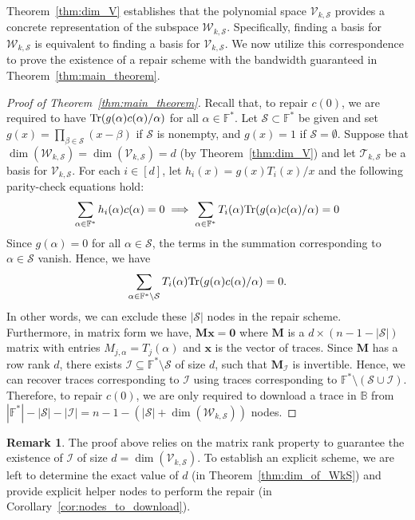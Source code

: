 \documentclass[onecolumn]{IEEEtran}
\theoremstyle{plain}
\theoremstyle{definition}
\newtheorem{remark}[definition]{Remark}
\newcommand{\FF}{\mathbb{F}}
\newcommand{\BB}{\mathbb{B}}
\newcommand{\cS}{\mathcal{S}}
\newcommand{\cT}{\mathcal{T}}
\newcommand{\cW}{\mathcal{W}}
\newcommand{\cV}{\mathcal{V}}
\newcommand{\cI}{\mathcal{I}}
\newcommand{\tr}{{\rm Tr}}
\begin{document}
Theorem~\ref{thm:dim_V} establishes that the polynomial space $\cV_{k,\cS}$ provides a concrete representation of the subspace $\cW_{k,\cS}$. 
Specifically, finding a basis for $\cW_{k,\cS}$ is equivalent to finding a basis for $\cV_{k,\cS}$.
We now utilize this correspondence to prove the existence of a repair scheme with the bandwidth guaranteed in Theorem~\ref{thm:main_theorem}.

\begin{proof}[Proof of Theorem~\ref{thm:main_theorem}]
    Recall that, to repair $c(0)$, we are required to have $\tr(g(\alpha)c(\alpha)/\alpha)$ for all $\alpha\in\FF^*$. Let $\cS\subset \FF^*$ be given and set $g(x) = \prod_{\beta\in\cS}(x-\beta)$ if $\cS$ is nonempty, and $g(x) = 1$ if $\cS = \emptyset$. Suppose that $\dim(\cW_{k,\cS}) = \dim(\cV_{k,\cS}) = d$ (by Theorem~\ref{thm:dim_V}) and let $\cT_{k,\cS}$ be a basis for $\cV_{k,\cS}$. For each $i\in[d]$, let $h_i(x) = g(x)T_i(x)/x$ and the following parity-check equations hold:
    $$
    \sum_{\alpha\in\FF^*} h_i(\alpha)c(\alpha) = 0 \implies \sum_{\alpha \in \FF^*} T_i(\alpha) \tr(g(\alpha)c(\alpha)/\alpha) = 0
    $$
    Since $g(\alpha) = 0$ for all $\alpha \in \cS$, the terms in the summation corresponding to $\alpha\in\cS$ vanish. Hence, we have
    $$
    \sum_{\alpha \in \FF^*\setminus\cS} T_i(\alpha) \tr(g(\alpha)c(\alpha)/\alpha) = 0.
    $$
    In other words, we can exclude these $|\cS|$ nodes in the repair scheme. Furthermore, in matrix form we have, $\boldsymbol{Mx} = \boldsymbol{0}$
    where $\boldsymbol{M}$ is a $d\times(n-1-|\cS|)$ matrix with entries $M_{j,\alpha} = T_j(\alpha)$ and $\boldsymbol{x}$ is the vector of traces. Since $\boldsymbol{M}$ has a row rank $d$, there exists $\cI\subseteq \FF^*\setminus\cS$ of size $d$, such that $\boldsymbol{M}_{\cI}$ is invertible. Hence, we can recover traces corresponding to $\cI$ using traces corresponding to $\FF^*\setminus(\cS\cup \cI)$. Therefore, to repair $c(0)$, we are only required to download a trace in $\BB$ from $|\FF^*|-|\cS| - |\cI| = n - 1 - (|\cS| + \dim(\cW_{k,\cS}))$ nodes.
\end{proof}

\begin{remark}
    The proof above relies on the matrix rank property to guarantee the existence of $\cI$ of size $d = \dim(\cV_{k,\cS})$. To establish an explicit scheme, we are left to determine the exact value of $d$ (in Theorem~\ref{thm:dim_of_WkS}) and provide explicit helper nodes to perform the repair (in Corollary~\ref{cor:nodes_to_download}).
\end{remark}
\end{document}
